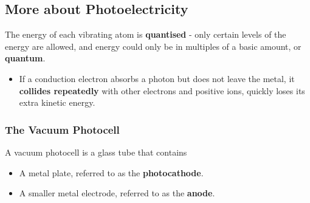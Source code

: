 \subsection{More about Photoelectricity}

The energy of each vibrating atom is \textbf{quantised} - only certain levels of the energy are allowed, and energy could only be in multiples of a basic amount, or \textbf{quantum}.
\begin{itemize}
    \item If a conduction electron absorbs a photon but does not leave the metal, it \textbf{collides repeatedly} with other electrons and positive ions, quickly loses its extra kinetic energy.
\end{itemize}

\subsubsection*{The Vacuum Photocell}

A vacuum photocell is a glass tube that contains
\begin{itemize}
    \item A metal plate, referred to as the \textbf{photocathode}.
    \item A smaller metal electrode, referred to as the \textbf{anode}.
\end{itemize}

